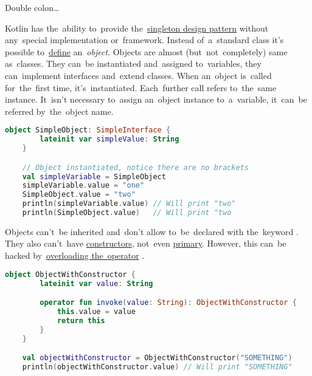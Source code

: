 \label{kotlinoperatoroverload}

\label{kotlincallablereference}
Double colon\dots

\label{kotlinobject}
Kotlin has the~ability to~provide the~\hyperref[singletondp]{singleton design pattern} without any~special implementation or~framework.
Instead of~a~standard class it's possible to~\hyperref[declarationdefinition]{define} an~\textit{object}.
Objects are almost (but~not~completely) same as~classes.
They can~be instantiated and~assigned to~variables, they can~implement interfaces and~extend classes.
When an~object is~called for~the~first time, it's~instantiated.
Each~further call refers to~the~same instance.
It~isn't necessary to~assign an~object instance to~a~variable, it~can~be referred by~the~object name.

\begin{lstlisting}[language=Kotlin]
    object SimpleObject: SimpleInterface {
        lateinit var simpleValue: String
    }

    // Object instantiated, notice there are no brackets
    val simpleVariable = SimpleObject
    simpleVariable.value = "one"
    SimpleObject.value = "two"
    println(simpleVariable.value) // Will print "two"
    println(SimpleObject.value)   // Will print "two
\end{lstlisting}

\noindent Objects can't~be inherited and~don't allow to~be~declared with the~keyword .
They also can't~have \hyperref[kotlinconstructor]{constructors}, not~even \hyperref[kotlinprimaryconstructor]{primary}.
However, this can~be hacked by~\hyperref[kotlinoperatoroverload]{overloading the~operator} .

\begin{lstlisting}[language=Kotlin]
    object ObjectWithConstructor {
        lateinit var value: String

        operator fun invoke(value: String): ObjectWithConstructor {
            this.value = value
            return this
        }
    }

    val objectWithConstructor = ObjectWithConstructor("SOMETHING")
    println(objectWithConstructor.value) // Will print "SOMETHING"
\end{lstlisting}
\newline

